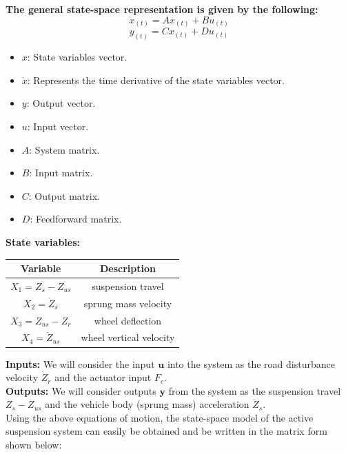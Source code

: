 \textbf{The general state-space representation is given by the following:}
$$\dot{x}_{(t)}=Ax_{(t)}+Bu_{(t)}$$
$$y_{(t)}=Cx_{(t)}+Du_{(t)}$$

\begin{itemize}
	\item $x$: State variables vector.
	\item $\dot{x}$: Represents the time derivative of the state variables vector.
	\item $y$: Output vector.
	\item $u$: Input vector.
	\item $A$: System matrix.
	\item $B$: Input matrix.
	\item $C$: Output matrix.
	\item $D$: Feedforward matrix.\\
\end{itemize}

\textbf{State variables:}
\begin{center}
	\begin{tabular}{|c|c|}
		\hline
		\textbf{Variable} & \textbf{Description} \\ \hline
		$X_1 = Z_s - Z_{us}$ & suspension travel \\ \hline
		$X_2 = \dot{Z}_s$ & sprung mass velocity \\ \hline
		$X_3 = Z_{us} - Z_r$ & wheel deflection \\ \hline
		$X_4 = \dot{Z}_{us}$ & wheel vertical velocity \\ \hline
	\end{tabular}
\end{center}

\newpage
\textbf{Inputs:} We will consider the input $\boldsymbol{u}$ into the system as the road disturbance velocity $\dot{Z}_r$ and the actuator input $F_c$.\\

\textbf{Outputs:} We will consider outputs $\boldsymbol{y}$ from the system as the suspension travel $Z_s-Z_{us}$ and the vehicle body (sprung mass) acceleration $\ddot{Z}_s$.\\

Using the above equations of motion, the state-space model of the active suspension system can easily be obtained and be written in the matrix form shown below:

